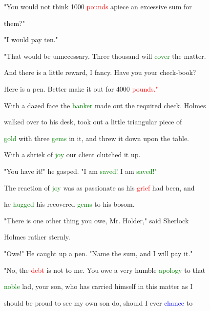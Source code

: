  "You would not think 1000 \textcolor{red}{pounds} apiece an excessive sum for

 them?"



 "I would \textcolor{BurntOrange}{pay} ten."



 "That would be unnecessary. Three thousand will \textcolor{green}{cover} the matter.

 And there is a little \textcolor{BurntOrange}{reward,} I \textcolor{BurntOrange}{fancy.} Have you your check-book?

 Here is a pen. Better make it out for 4000 \textcolor{red}{pounds."}



 With a dazed face the \textcolor{green}{banker} made out the required check. Holmes

 walked over to his desk, took out a little triangular piece of

 \textcolor{green}{gold} with three \textcolor{green}{gems} in it, and threw it down upon the table.



 With a \textcolor{BurntOrange}{shriek} of \textcolor{green}{joy} our client clutched it up.



 "You have it!" he gasped. "I am \textcolor{green}{saved!} I am \textcolor{green}{saved!"}



 The reaction of \textcolor{green}{joy} was as \textcolor{BurntOrange}{passionate} as his \textcolor{red}{grief} had been, and

 he \textcolor{green}{hugged} his recovered \textcolor{green}{gems} to his bosom.



 "There is one other thing you owe, Mr. Holder," said Sherlock

 Holmes rather sternly.



 "Owe!" He caught up a pen. "Name the sum, and I will \textcolor{BurntOrange}{pay} it."



 "No, the \textcolor{red}{debt} is not to me. You owe a very \textcolor{BurntOrange}{humble} \textcolor{green}{apology} to that

 \textcolor{green}{noble} lad, your son, who has carried himself in this matter as I

 should be \textcolor{BurntOrange}{proud} to see my own son do, should I ever \textcolor{blue}{chance} to


